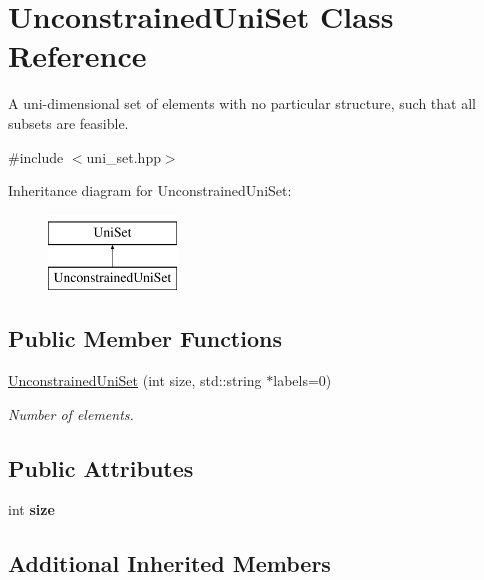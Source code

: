 \hypertarget{classUnconstrainedUniSet}{\section{Unconstrained\-Uni\-Set Class Reference}
\label{classUnconstrainedUniSet}
}


A uni-\/dimensional set of elements with no particular structure, such that all subsets are feasible.  




{\ttfamily \#include $<$uni\-\_\-set.\-hpp$>$}

Inheritance diagram for Unconstrained\-Uni\-Set\-:\begin{figure}[H]
\begin{center}
\leavevmode
\includegraphics[height=2.000000cm]{classUnconstrainedUniSet}
\end{center}
\end{figure}
\subsection*{Public Member Functions}
\begin{DoxyCompactItemize}
\item 
\hyperlink{classUnconstrainedUniSet_a20fc36ba63c5e3d534092f3c9ec480a1}{Unconstrained\-Uni\-Set} (int size, std\-::string $\ast$labels=0)
\begin{DoxyCompactList}\small\item\em Number of elements. \end{DoxyCompactList}\end{DoxyCompactItemize}
\subsection*{Public Attributes}
\begin{DoxyCompactItemize}
\item 
\hypertarget{classUnconstrainedUniSet_a919c5b1e24466893a73752ad610c1d7f}{int {\bfseries size}}\label{classUnconstrainedUniSet_a919c5b1e24466893a73752ad610c1d7f}

\end{DoxyCompactItemize}
\subsection*{Additional Inherited Members}


